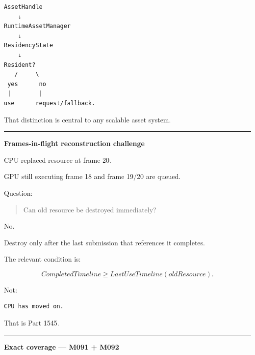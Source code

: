 \begin{verbatim}
AssetHandle
    ↓
RuntimeAssetManager
    ↓
ResidencyState
    ↓
Resident?
   /     \
 yes      no
 |        |
use      request/fallback.
\end{verbatim}

That distinction is central to any scalable asset system.

\begin{center}\rule{0.5\linewidth}{0.5pt}\end{center}

\textbf{Frames-in-flight reconstruction challenge}

CPU replaced resource at frame 20.

GPU still executing frame 18 and frame 19/20 are queued.

Question:

\begin{quote}
Can old resource be destroyed immediately?
\end{quote}

No.

Destroy only after the last submission that references it completes.

The relevant condition is:

\[
CompletedTimeline
\ge
LastUseTimeline(oldResource).
\]

Not:

\begin{verbatim}
CPU has moved on.
\end{verbatim}

That is Part 1545.

\begin{center}\rule{0.5\linewidth}{0.5pt}\end{center}

\textbf{Exact coverage --- M091 + M092}

